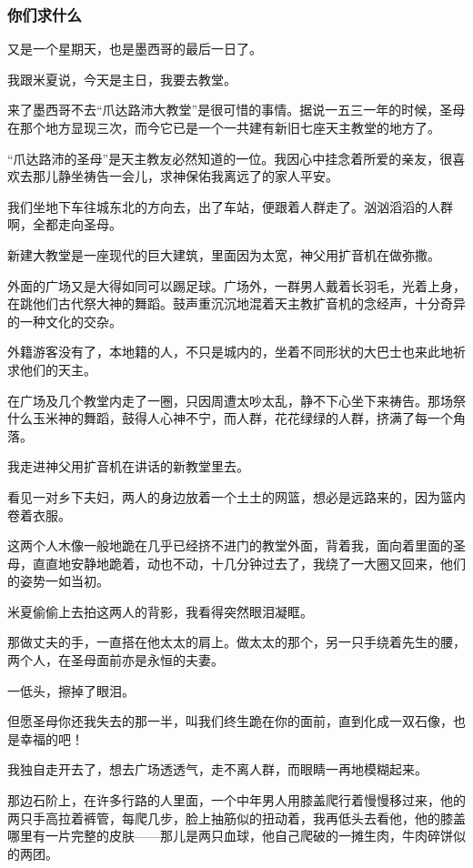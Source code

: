 \subsubsection*{你们求什么}
\par 又是一个星期天，也是墨西哥的最后一日了。
\par 我跟米夏说，今天是主日，我要去教堂。
\par 来了墨西哥不去“爪达路沛大教堂”是很可惜的事情。据说一五三一年的时候，圣母在那个地方显现三次，而今它已是一个一共建有新旧七座天主教堂的地方了。
\par “爪达路沛的圣母”是天主教友必然知道的一位。我因心中挂念着所爱的亲友，很喜欢去那儿静坐祷告一会儿，求神保佑我离远了的家人平安。
\par 我们坐地下车往城东北的方向去，出了车站，便跟着人群走了。汹汹滔滔的人群啊，全都走向圣母。
\par 新建大教堂是一座现代的巨大建筑，里面因为太宽，神父用扩音机在做弥撒。
\par 外面的广场又是大得如同可以踢足球。广场外，一群男人戴着长羽毛，光着上身，在跳他们古代祭大神的舞蹈。鼓声重沉沉地混着天主教扩音机的念经声，十分奇异的一种文化的交杂。
\par 外籍游客没有了，本地籍的人，不只是城内的，坐着不同形状的大巴士也来此地祈求他们的天主。
\par 在广场及几个教堂内走了一圈，只因周遭太吵太乱，静不下心坐下来祷告。那场祭什么玉米神的舞蹈，鼓得人心神不宁，而人群，花花绿绿的人群，挤满了每一个角落。
\par 我走进神父用扩音机在讲话的新教堂里去。
\par 看见一对乡下夫妇，两人的身边放着一个土土的网篮，想必是远路来的，因为篮内卷着衣服。
\par 这两个人木像一般地跪在几乎已经挤不进门的教堂外面，背着我，面向着里面的圣母，直直地安静地跪着，动也不动，十几分钟过去了，我绕了一大圈又回来，他们的姿势一如当初。
\par 米夏偷偷上去拍这两人的背影，我看得突然眼泪凝眶。
\par 那做丈夫的手，一直搭在他太太的肩上。做太太的那个，另一只手绕着先生的腰，两个人，在圣母面前亦是永恒的夫妻。
\par 一低头，擦掉了眼泪。
\par 但愿圣母你还我失去的那一半，叫我们终生跪在你的面前，直到化成一双石像，也是幸福的吧！
\par 我独自走开去了，想去广场透透气，走不离人群，而眼睛一再地模糊起来。
\par 那边石阶上，在许多行路的人里面，一个中年男人用膝盖爬行着慢慢移过来，他的两只手高拉着裤管，每爬几步，脸上抽筋似的扭动着，我再低头去看他，他的膝盖哪里有一片完整的皮肤——那儿是两只血球，他自己爬破的一摊生肉，牛肉碎饼似的两团。
